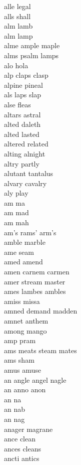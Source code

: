 alle legal \\
alls shall \\
alm lamb \\
alm lamp \\
alme ample maple \\
alms psalm lamps \\
alo hola \\
alp claps clasp  \\
alpine pineal\\
als laps slap \\
alse fleas \\
altars astral\\
alted daleth \\
alted lasted \\
altered related\\
alting alnight \\
altry partly \\
alutant tantalus \\
alvary cavalry \\
aly play \\
am ma\\
am mad \\
am mah \\
am's rams' arm's \\
amble marble \\
ame seam \\
amed amend \\
amen carnem carmen  \\
amer stream master  \\
ames lambes ambles  \\
amiss missa\\
amned demand madden \\
amnet anthem \\
among mango\\
amp pram \\
ams meats steam mates  \\
ams sham \\
amus amuse \\
an angle angel nagle   \\
an anno anon  \\
an na\\
an nab \\
an nag \\
anager magrane \\
ance clean \\
ances cleans \\
ancti antics \\
